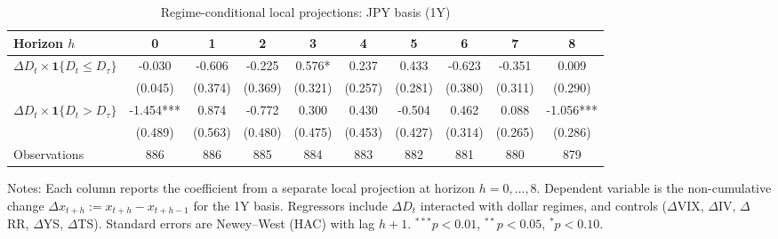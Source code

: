 \begin{table}[!htbp]\centering
\caption{Regime-conditional local projections: JPY basis (1Y)}
\label{tab:lp_jpy_1y}
\begin{tabular}{lccccccccc}
\toprule
Horizon $h$ & 0 & 1 & 2 & 3 & 4 & 5 & 6 & 7 & 8 \\
\midrule
$\Delta D_t \times \mathbf{1}\{D_t \le D_\tau\}$ & -0.030 & -0.606 & -0.225 & 0.576* & 0.237 & 0.433 & -0.623 & -0.351 & 0.009 \\
  & (0.045) & (0.374) & (0.369) & (0.321) & (0.257) & (0.281) & (0.380) & (0.311) & (0.290) \\
$\Delta D_t \times \mathbf{1}\{D_t > D_\tau\}$ & -1.454*** & 0.874 & -0.772 & 0.300 & 0.430 & -0.504 & 0.462 & 0.088 & -1.056*** \\
  & (0.489) & (0.563) & (0.480) & (0.475) & (0.453) & (0.427) & (0.314) & (0.265) & (0.286) \\
\midrule
Observations & 886 & 886 & 885 & 884 & 883 & 882 & 881 & 880 & 879 \\
\bottomrule
\end{tabular}
\begin{flushleft}\footnotesize Notes: Each column reports the coefficient from a separate local projection at horizon $h=0,\dots,8$. Dependent variable is the non-cumulative change $\Delta x_{t+h}:=x_{t+h}-x_{t+h-1}$ for the 1Y basis. Regressors include $\Delta D_t$ interacted with dollar regimes, and controls ($\Delta$VIX, $\Delta$IV, $\Delta$RR, $\Delta$YS, $\Delta$TS). Standard errors are Newey--West (HAC) with lag $h+1$. $^{***}p<0.01$, $^{**}p<0.05$, $^{*}p<0.10$.\end{flushleft}
\end{table}